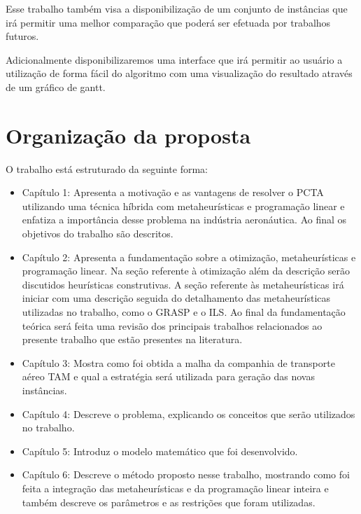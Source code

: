 Esse trabalho também visa a disponibilização de um conjunto de instâncias que
irá permitir uma melhor comparação que poderá ser efetuada por trabalhos
futuros.

Adicionalmente disponibilizaremos uma interface que irá permitir ao usuário a
utilização de forma fácil do algoritmo com uma visualização do resultado através
de um gráfico de gantt.

\section {Organização da proposta }

O trabalho está estruturado da seguinte forma:

\begin{itemize}

\item Capítulo 1: Apresenta a motivação e as vantagens de resolver o PCTA
utilizando uma técnica híbrida com metaheurísticas e programação linear e
enfatiza a importância desse problema na indústria aeronáutica. Ao final os
objetivos do trabalho são descritos.

\item Capítulo 2: Apresenta a fundamentação sobre a otimização, metaheurísticas
e programação linear. Na seção referente à otimização além da descrição serão
discutidos heurísticas construtivas. A seção referente às metaheurísticas irá
iniciar com uma descrição seguida do detalhamento das metaheurísticas
utilizadas no trabalho, como o GRASP e o ILS. Ao final da fundamentação teórica
será feita uma revisão dos principais trabalhos relacionados ao presente
trabalho que estão presentes na literatura.

\item Capítulo 3: Mostra como foi obtida a malha da companhia de transporte aéreo TAM e qual a estratégia será utilizada para geração das novas instâncias.

\item Capítulo 4: Descreve o problema, explicando os conceitos que serão utilizados no trabalho.

\item Capítulo 5: Introduz o modelo matemático que foi desenvolvido.

\item Capítulo 6: Descreve o método proposto nesse trabalho, mostrando como foi feita a integração das metaheurísticas e da programação linear inteira e também descreve os parâmetros e as restrições que foram utilizadas.


\end{itemize}
